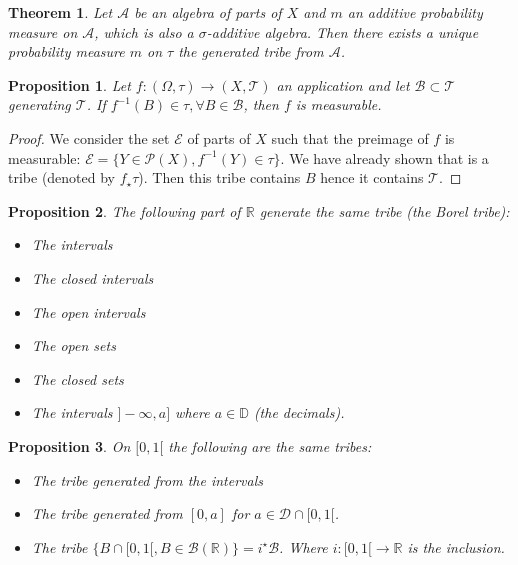 \documentclass[10pt,a4paper]{book}
\newtheorem{theorem}{Theorem}[section]
\newtheorem{proposition}{Proposition}[section]
\theoremstyle{definition}
\begin{document}
\begin{theorem}
Let $\mathcal{A}$ be an algebra of parts of $X$ and $m$ an additive probability measure on $\mathcal{A}$, which is also a $\sigma$-additive algebra. Then there exists a unique probability measure $m$ on $\tau$ the generated tribe from $\mathcal{A}$. 
\end{theorem}

\begin{proposition}
Let $f: (\Omega, \tau) \to (X, \mathcal{T})$ an application and let $\mathcal{B} \subset \mathcal{T}$ generating $\mathcal{T}$. If $f^{-1}(B) \in \tau, \forall B \in \mathcal{B}$, then $f$ is measurable.
\end{proposition}

\begin{proof}
We consider the set $\mathcal{E}$ of parts of $X$ such that the preimage of $f$ is measurable: $\mathcal{E} = \{Y \in \mathcal{P}(X), f^{-1}(Y) \in \tau\}$. We have already shown that is a tribe (denoted by $f_\star \tau$). Then this tribe contains $B$ hence it contains $\mathcal{T}$. 
\end{proof}

\begin{proposition}
The following part of $\mathbb{R}$ generate the same tribe (the Borel tribe):
\begin{itemize}
\item The intervals
\item The closed intervals
\item The open intervals
\item The open sets
\item The closed sets
\item The intervals $]-\infty, a]$ where $a \in \mathbb{D}$ (the decimals).
\end{itemize}
\end{proposition}

\begin{proposition}
On $[0,1[$ the following are the same tribes:
\begin{itemize}
\item The tribe generated from the intervals
\item The tribe generated from $[0, a]$ for $a \in \mathcal{D} \cap [0, 1[$. 
\item The tribe $\{B \cap [0, 1[, B \in \mathcal{B}(\mathbb{R})\} = i^\star \mathcal{B}$. Where $i : [0, 1[ \to \mathbb{R}$ is the inclusion.  
\end{itemize}
\end{proposition}
\end{document}
